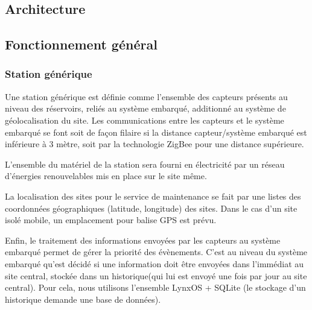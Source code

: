   \subsection{Architecture}
  
  
  \subsection{Fonctionnement général} 
     
    \subsubsection{Station générique}
Une station générique est définie comme l'ensemble des capteurs présents au niveau des réservoirs, reliés au système embarqué, additionné au système de géolocalisation du site. Les communications entre les capteurs et le système embarqué se font soit de façon filaire si la distance capteur/système embarqué est inférieure à 3 mètre, soit par la technologie ZigBee pour une distance supérieure. 
\par L'ensemble du matériel de la station sera fourni en électricité par un réseau d'énergies renouvelables mis en place sur le site même.
\par La localisation des sites pour le service de maintenance se fait par une listes des coordonnées géographiques (latitude, longitude) des sites. Dans le cas d'un site isolé mobile, un emplacement pour balise GPS est prévu.
\par Enfin, le traitement des informations envoyées par les capteurs au système embarqué permet de gérer la priorité des évènements. C'est au niveau du système embarqué qu'est décidé si une information doit être envoyées dans l'immédiat au site central, stockée dans un historique(qui lui est envoyé une fois par jour au site central). Pour cela, nous utilisons l'ensemble LynxOS + SQLite (le stockage d'un historique demande une base de données). 
    
